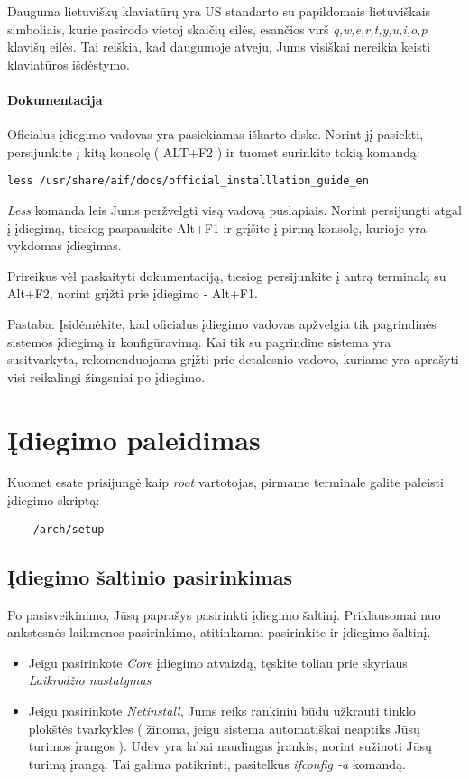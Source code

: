 \documentclass[a4paper]{book}
\begin{document}
  Dauguma lietuviškų klaviatūrų yra US standarto su papildomais
  lietuviškais simboliais, kurie pasirodo vietoj skaičių eilės,
  esančios virš \textsl{q,w,e,r,t,y,u,i,o,p} klavišų eilės. Tai
  reiškia, kad daugumoje atveju, Jums visiškai nereikia keisti
  klaviatūros išdėstymo.

  \paragraph{Dokumentacija}

  Oficialus įdiegimo vadovas yra pasiekiamas iškarto diske. Norint jį
  pasiekti, persijunkite į kitą konsolę ( ALT+F2 ) ir tuomet surinkite
  tokią komandą:
  \begin{verbatim}
less /usr/share/aif/docs/official_installlation_guide_en
  \end{verbatim}

  \textsl{Less} komanda leis Jums peržvelgti visą vadovą
  puslapiais. Norint persijungti atgal į įdiegimą, tiesiog paspauskite
  Alt+F1 ir grįšite į pirmą konsolę, kurioje yra vykdomas įdiegimas.

  Prireikus vėl paskaityti dokumentaciją, tiesiog persijunkite į antrą
  terminalą su Alt+F2, norint grįžti prie įdiegimo - Alt+F1.

  Pastaba: Įsidėmėkite, kad oficialus įdiegimo vadovas apžvelgia tik
  pagrindinės sistemos įdiegimą ir konfigūravimą. Kai tik su
  pagrindine sistema yra susitvarkyta, rekomenduojama grįžti prie
  detalesnio vadovo, kuriame yra aprašyti visi reikalingi žingsniai po
  įdiegimo.

  \section{Įdiegimo paleidimas}

  Kuomet esate prisijungė kaip \textsl{root} vartotojas, pirmame
  terminale galite paleisti įdiegimo skriptą:
  \begin{verbatim}
    /arch/setup
  \end{verbatim}

  \subsection{Įdiegimo šaltinio pasirinkimas}

  Po pasisveikinimo, Jūsų paprašys pasirinkti įdiegimo
  šaltinį. Priklausomai nuo ankstesnės laikmenos pasirinkimo,
  atitinkamai pasirinkite ir įdiegimo šaltinį.
  \begin{itemize}
    \item Jeigu pasirinkote \textsl{Core} įdiegimo atvaizdą, tęskite
      toliau prie skyriaus \textsl{Laikrodžio nustatymas}
    \item Jeigu pasirinkote \textsl{Netinstall}, Jums reiks rankiniu
      būdu užkrauti tinklo plokštės tvarkykles ( žinoma, jeigu sistema
      automatiškai neaptiks Jūsų turimos įrangos ). Udev yra labai
      naudingas įrankis, norint sužinoti Jūsų turimą įrangą. Tai
      galima patikrinti, pasitelkus \textsl{ifconfig -a} komandą.
  \end{itemize}
\end{document}
